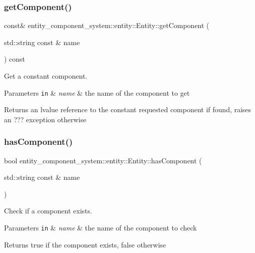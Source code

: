 \subsubsection{get\+Component()\hspace{0.1cm}{\footnotesize\ttfamily [2/2]}}
{\footnotesize{} const\& entity\+\_\+component\+\_\+system\+::entity\+::\+Entity\+::get\+Component (\begin{DoxyParamCaption}\item[{std\+::string const \&}]{name }\end{DoxyParamCaption}) const\hspace{0.3cm}{\ttfamily [inline]}}



Get a constant component. 


\begin{DoxyParams}[1]{Parameters}
\mbox{\tt in}  & {\em name} & the name of the component to get \\
\hline
\end{DoxyParams}
\begin{DoxyReturn}{Returns}
an lvalue reference to the constant requested component if found, raises an ??? exception otherwise 
\end{DoxyReturn}
\label{classentity__component__system_1_1entity_1_1_entity_a6f6e2f41ef9674397d4ce26699039e44} 
\subsubsection{has\+Component()}
{\footnotesize\ttfamily bool entity\+\_\+component\+\_\+system\+::entity\+::\+Entity\+::has\+Component (\begin{DoxyParamCaption}\item[{std\+::string const \&}]{name }\end{DoxyParamCaption})\hspace{0.3cm}{\ttfamily [inline]}}



Check if a component exists. 


\begin{DoxyParams}[1]{Parameters}
\mbox{\tt in}  & {\em name} & the name of the component to check \\
\hline
\end{DoxyParams}
\begin{DoxyReturn}{Returns}
true if the component exists, false otherwise 
\end{DoxyReturn}
\label{classentity__component__system_1_1entity_1_1_entity_a1b78a595fb1bfcab10183de7589088ed} 
